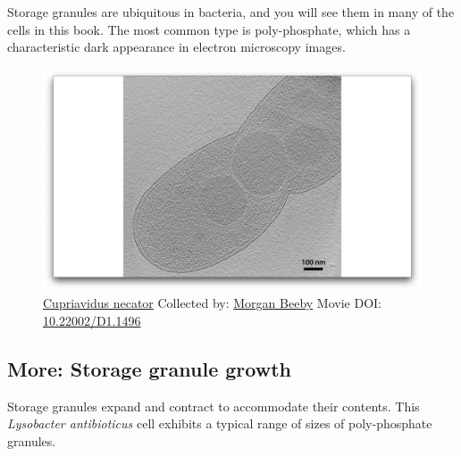\documentclass[]{tufte-book}
\begin{document}
Storage granules are ubiquitous in bacteria, and you will see them in
many of the cells in this book. The most common type is poly-phosphate,
which has a characteristic dark appearance in electron microscopy
images.





\begin{figure}
\includegraphics{movie_stills/4_8} \caption[\protect\hyperlink{tree}{Cupriavidus necator} Collected by:
\protect\hyperlink{morgan_beeby}{Morgan Beeby} Movie DOI:
\href{https://doi.org/10.22002/D1.1496}{10.22002/D1.1496}]{\protect\hyperlink{tree}{Cupriavidus necator} Collected by:
\protect\hyperlink{morgan_beeby}{Morgan Beeby} Movie DOI:
\href{https://doi.org/10.22002/D1.1496}{10.22002/D1.1496}}\label{fig:4-8}
\end{figure}

\hypertarget{Storage_granule_growth}{\subsection*{More: Storage granule
growth}\label{Storage_granule_growth}}

Storage granules expand and contract to accommodate their contents. This
\emph{Lysobacter antibioticus} cell exhibits a typical range of sizes of
poly-phosphate granules.
\end{document}
